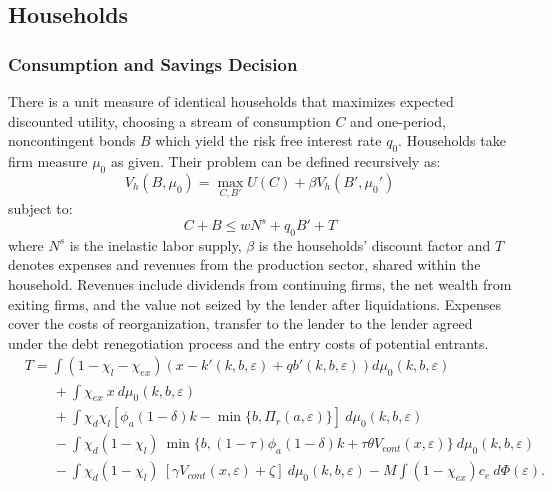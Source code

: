 \documentclass[12pt]{article}
\begin{document}
\subsection{Households}\label{sec:hh}
\subsubsection{Consumption and Savings Decision} \label{sec:Cons and Savings decision}
There is a unit measure of identical households that maximizes expected discounted utility, choosing a stream of consumption $C$ and one-period, noncontingent bonds $B$ which yield the risk free interest rate $q_0$. Households take firm measure $\mu_0$ as given. Their problem can be defined recursively as: 
\begin{equation} \label{eq:U_max}
V_h(B, \mu_0) = \max_{C,B'} U(C) + \beta V_h(B',\mu_0')
\end{equation}  
subject to: 
\begin{equation} \label{eq:const_hh}
C + B \leq w N^s + q_0 B' + T
\end{equation} 
where $N^s$ is the inelastic labor supply, $\beta$ is the households' discount factor and $T$ denotes expenses and revenues from the production sector, shared within the household. Revenues include dividends from continuing firms, the net wealth from exiting firms, and the value not seized by the lender after liquidations. Expenses cover the costs of reorganization, transfer to the lender to the lender agreed under the debt renegotiation process and the entry costs of potential entrants. 
\begin{equation*} \label{eq:T}
    \begin{split}
        & T = \int (1 - \chi_l - \chi_{ex}) \left( x - k'(k,b,\varepsilon) + qb'(k,b,\varepsilon) \right) d \mu_0(k,b,\varepsilon) \\
        & \qquad + \int \chi_{ex} \ x \ d \mu_0(k,b,\varepsilon) \\
        & \qquad + \int \chi_d \chi_{l} [ \phi_a (1-\delta) k -  \min\{b, \Pi_{r}(a,\varepsilon) \} ] \ d \mu_0(k,b,\varepsilon)  \\
        & \qquad  - \int \chi_d (1-\chi_{l}) \ \min\{b, (1-\tau) \phi_a (1-\delta) k +\tau \theta V_{cont} (x, \varepsilon)        \} \ d \mu_0(k,b,\varepsilon) \\
        & \qquad  - \int \chi_d (1-\chi_{l}) \  [ \gamma V_{cont} (x, \varepsilon) + \zeta] \ d \mu_0(k,b,\varepsilon) - M \int (1-\chi_{ex}) c_e \ d \Phi(\varepsilon) .
    \end{split}
\end{equation*}
\end{document}
